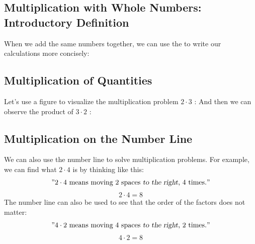 	\subsection*{Multiplication with Whole Numbers: Introductory Definition}
	When we add the same numbers together, we can use the 
	\sym{$ \cdot $}
	to write our calculations more concisely: \regv
	 \regv
	
	\newpage
	\subsection*{Multiplication of Quantities} \label{gangmengd}
	Let’s use a figure to visualize the multiplication problem
	$ 2\cdot3 $
	\!\!:
	\fig{2t3}
	And then we can observe the product of
	$ 3\cdot 2 $
	\!\!:
	
	\subsection*{Multiplication on the Number Line}
	We can also use the number line to solve multiplication problems. For example, we can find what
	$ 2\cdot4 $
	is by thinking like this:
	\[\text{''} 2\cdot 4 \text{ means moving 2 spaces \textsl{to the right}, 4 times.}\text{''} \]
	\[ 2\cdot4=8 \]
	The number line can also be used to see that the order of the factors does not matter:
	\[\text{''} 4\cdot 2 \text{ means moving 4 spaces \textsl{to the right}, 2 times.}\text{''} \]
	\[ 4\cdot2=8 \]
	
